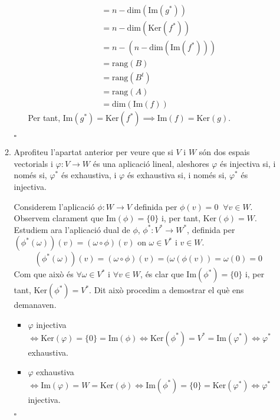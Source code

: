 \documentclass[11pt,a4paper]{article}
\newcommand*{\QED}{\hfill\ensuremath{\square}}
\begin{document}
\begin{enumerate}
\begin{enumerate}
\begin{itemize}
\begin{align*}
                &=n-\text{dim}(\text{Im}(g^*))\\
                &=n-\text{dim}(\text{Ker}(f^*))\\
                &=n-(n-\text{dim}(\text{Im}(f^*)))\\
                &=\text{rang}(B)\\
                &=\text{rang}(B^t)\\
                &=\text{rang}(A)\\
                &=\text{dim}(\text{Im}(f))
            \end{align*}
            Per tant, $\text{Im}(g^*)=\text{Ker}(f^*)\implies\text{Im}(f)=\text{Ker}(g)$.
        \end{itemize}
        \QED
        \item Aprofiteu l'apartat anterior per veure que si $V$ i $W$ són dos espais vectorials i $\varphi:V\longrightarrow W$ és una aplicació lineal, aleshores $\varphi$ és injectiva si, i només si, $\varphi^*$ és exhaustiva, i $\varphi$ és exhaustiva si, i només si, $\varphi^*$ és injectiva.\par
        Considerem l'aplicació $\phi:W\longrightarrow V$ definida per $\phi(v)=0\;\;\forall v\in W$. Observem clarament que $\text{Im}(\phi)=\{0\}$ i, per tant, $\text{Ker}(\phi)=W$. Estudiem ara l'aplicació dual de $\phi$, $\phi^*:V^*\longrightarrow W^*$, definida per $(\phi^*(\omega))(v)=(\omega\circ\phi)(v)$ on $\omega\in V^*$ i $v\in W$. $$(\phi^*(\omega))(v)=(\omega\circ\phi)(v)=(\omega(\phi(v))=\omega(0)=0$$ Com que això és $\forall \omega\in V^*$ i $\forall v\in W$, és clar que $\text{Im}(\phi^*)=\{0\}$ i, per tant, $\text{Ker}(\phi^*)=V^*$. Dit això procedim a demostrar el què ens demanaven.
        \begin{itemize}
            \item $\varphi$ injectiva $\iff\text{Ker}(\varphi)=\{0\}=\text{Im}(\phi)\iff\text{Ker}(\phi^*)=V^*=\text{Im}(\varphi^*)\iff\varphi^*$ exhaustiva.
            
            \item $\varphi$ exhaustiva $\iff\text{Im}(\varphi)=W=\text{Ker}(\phi)\iff\text{Im}(\phi^*)=\{0\}=\text{Ker}(\varphi^*)\iff\varphi^*$ injectiva.
        \end{itemize}
        \QED
        

\end{enumerate}
\end{enumerate}
\end{document}

